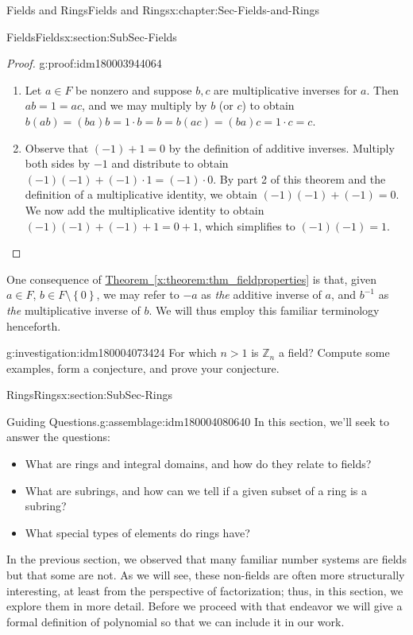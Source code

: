 \documentclass[oneside,10pt,]{book}
\newcommand{\xreffont}{\relax}
\numberwithin{equation}{section}
\newcommand{\set}[1]{\left\{ {#1} \right\}}
\def\Z{{\mathbb Z}}
\begin{document}
\begin{chapterptx}{Fields and Rings}{}{Fields and Rings}{}{}{x:chapter:Sec-Fields-and-Rings}
\begin{sectionptx}{Fields}{}{Fields}{}{}{x:section:SubSec-Fields}
\begin{proof}{}{g:proof:idm180003944064}
\begin{enumerate}
\item{}Let \(a\in F\) be nonzero and suppose \(b,c\) are multiplicative inverses for \(a\). Then \(ab = 1 = ac\), and we may multiply by \(b\) (or \(c\)) to obtain \(b(ab) = (ba)b = 1\cdot b = b = b(ac) = (ba)c = 1\cdot c = c\).%
\item{}Observe that \((-1) + 1 = 0\) by the definition of additive inverses. Multiply both sides by \(-1\) and distribute to obtain \((-1)(-1) + (-1)\cdot 1 = (-1)\cdot 0\). By part 2 of this theorem and the definition of a multiplicative identity, we obtain \((-1)(-1) + (-1) = 0\). We now add the multiplicative identity to obtain \((-1)(-1) + (-1) + 1 = 0 + 1\), which simplifies to \((-1)(-1) = 1\).%
\end{enumerate}
\end{proof}
One consequence of \hyperref[x:theorem:thm_fieldproperties]{Theorem~{\xreffont\ref{x:theorem:thm_fieldproperties}}} is that, given \(a\in F\), \(b\in F\setminus \set{0}\), we may refer to \(-a\) as \emph{the} additive inverse of \(a\), and \(b^{-1}\) as \emph{the} multiplicative inverse of \(b\). We will thus employ this familiar terminology henceforth.%
\begin{investigation}{}{g:investigation:idm180004073424}%
For which \(n > 1\) is \(\Z_n\) a field? Compute some examples, form a conjecture, and prove your conjecture.%
\end{investigation}
\end{sectionptx}
%
%
\typeout{************************************************}
\typeout{************************************************}
%
\begin{sectionptx}{Rings}{}{Rings}{}{}{x:section:SubSec-Rings}
\begin{assemblage}{Guiding Questions.}{g:assemblage:idm180004080640}%
In this section, we'll seek to answer the questions: %
\begin{itemize}[label=\textbullet]
\item{}What are rings and integral domains, and how do they relate to fields?%
\item{}What are subrings, and how can we tell if a given subset of a ring is a subring?%
\item{}What special types of elements do rings have?%
\end{itemize}
%
\end{assemblage}
In the previous section, we observed that many familiar number systems are fields but that some are not. As we will see, these non-fields are often more structurally interesting, at least from the perspective of factorization; thus, in this section, we explore them in more detail. Before we proceed with that endeavor we will give a formal definition of polynomial so that we can include it in our work.%

\end{sectionptx}
\end{chapterptx}
\end{document}
